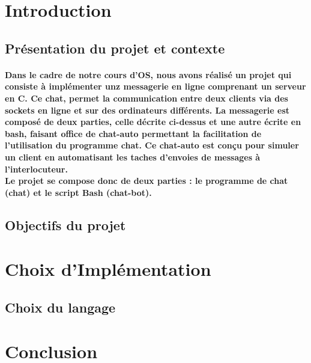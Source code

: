 \documentclass[utf8]{article}
\begin{document}
\newpage
\tableofcontents

\newpage



\section{Introduction}
\subsection{Présentation du projet et contexte}
\paragraph{Dans le cadre de notre cours d'OS, nous avons réalisé un projet qui consiste à implémenter unz messagerie en ligne comprenant un serveur en C.
Ce chat, permet la communication entre deux clients via des sockets en ligne et sur des ordinateurs différents. La messagerie est composé de deux parties, celle décrite ci-dessus et une autre écrite en bash,
faisant office de chat-auto permettant la facilitation de l'utilisation du programme chat. Ce chat-auto est conçu pour simuler un client en automatisant les taches d'envoies de messages à l'interlocuteur.\\
Le projet se compose donc de deux parties : le programme de chat (chat) et le script Bash (chat-bot).}

\subsection{Objectifs du projet}
\paragraph{}

\section{Choix d’Implémentation}
\subsection{Choix du langage}




\section{Conclusion}
\paragraph{}
\end{document}
